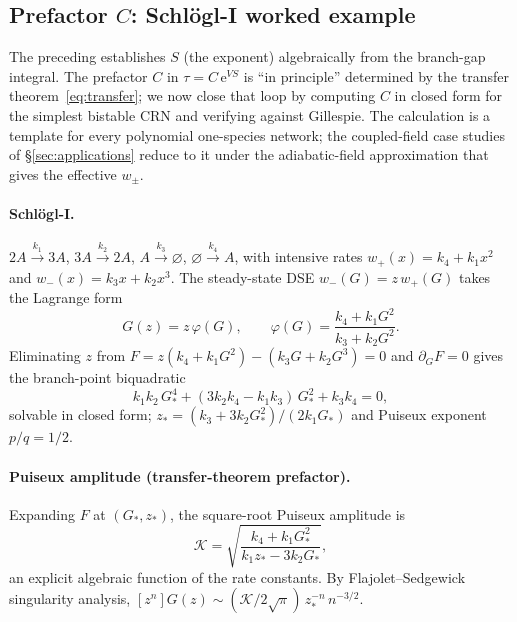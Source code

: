 \documentclass[11pt,a4paper]{article}
\newcommand{\ee}{\mathrm{e}}
\theoremstyle{plain}
\begin{document}
\subsection{Prefactor \texorpdfstring{$C$}{C}: Schl\"ogl-I worked example}
\label{sec:prefactor-schloegl}

The preceding establishes $S$ (the exponent) algebraically from
the branch-gap integral.  The prefactor $C$ in
$\tau = C\,\ee^{VS}$ is ``in principle'' determined by the
transfer theorem~\eqref{eq:transfer}; we now close that loop by
computing $C$ in closed form for the simplest bistable CRN and
verifying against Gillespie.  The calculation is a template for
every polynomial one-species network; the coupled-field case
studies of \S\ref{sec:applications} reduce to it under the
adiabatic-field approximation that gives the effective $w_\pm$.

\paragraph{Schl\"ogl-I.}
$2A \xrightarrow{k_1} 3A$, $3A \xrightarrow{k_2} 2A$,
$A \xrightarrow{k_3} \varnothing$,
$\varnothing \xrightarrow{k_4} A$, with intensive rates
$w_+(x) = k_4 + k_1 x^2$ and $w_-(x) = k_3 x + k_2 x^3$.  The
steady-state DSE $w_-(G) = z\,w_+(G)$ takes the Lagrange form
\begin{equation}\label{eq:schloegl-lagrange}
  G(z) = z\,\varphi(G),
  \qquad
  \varphi(G) = \frac{k_4 + k_1 G^2}{k_3 + k_2 G^2}.
\end{equation}
Eliminating $z$ from $F = z(k_4 + k_1 G^2) - (k_3 G + k_2 G^3) = 0$
and $\partial_G F = 0$ gives the branch-point biquadratic
\begin{equation}\label{eq:schloegl-branchpoly}
  k_1 k_2\,G_*^{4}
  + (3 k_2 k_4 - k_1 k_3)\,G_*^{2}
  + k_3 k_4 = 0,
\end{equation}
solvable in closed form; $z_* = (k_3 + 3 k_2 G_*^{2})/(2 k_1 G_*)$
and Puiseux exponent $p/q = 1/2$.

\paragraph{Puiseux amplitude (transfer-theorem prefactor).}
Expanding $F$ at $(G_*, z_*)$, the square-root Puiseux amplitude
is
\begin{equation}\label{eq:schloegl-K}
  \mathcal K
  = \sqrt{\dfrac{k_4 + k_1 G_*^{2}}{k_1 z_* - 3 k_2 G_*}},
\end{equation}
an explicit algebraic function of the rate constants.  By
Flajolet--Sedgewick singularity analysis,
$[z^n] G(z) \sim (\mathcal K/2\sqrt{\pi})\,z_*^{-n}\,n^{-3/2}$.
\end{document}
